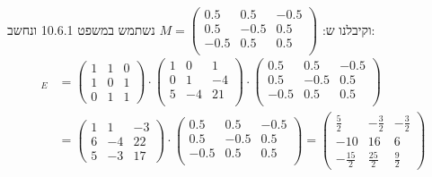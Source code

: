 \documentclass{article}
\begin{document}
	וקיבלנו ש: $M = \begin{pmatrix}
		0.5 & 0.5 & -0.5\\
		0.5 & -0.5 & 0.5 \\
		-0.5 & 0.5 & 0.5 \\
	\end{pmatrix}$
	נשתמש במשפט 10.6.1 ונחשב:
	\begin{align*}
		[T]_E &=
		\begin{pmatrix}
			1 & 1 & 0 \\
			1 & 0 & 1 \\
			0 & 1 & 1
		\end{pmatrix} \cdot
		\begin{pmatrix}
			1 & 0 & 1 \\
			0 & 1 & -4 \\
			5 & -4 & 21 \\
		\end{pmatrix} \cdot
		\begin{pmatrix}
			0.5 & 0.5 & -0.5\\
			0.5 & -0.5 & 0.5 \\
			-0.5 & 0.5 & 0.5 \\
		\end{pmatrix} \\
		&= \begin{pmatrix}
			1 & 1 & -3 \\
			6 & -4 & 22 \\
			5 & -3 & 17
		\end{pmatrix} \cdot
		\begin{pmatrix}
			0.5 & 0.5 & -0.5\\
			0.5 & -0.5 & 0.5 \\
			-0.5 & 0.5 & 0.5 \\
		\end{pmatrix} =
		\begin{pmatrix}
			\frac{5}{2} & -\frac{3}{2} & -\frac{3}{2} \\
			-10 & 16 & 6 \\
			-\frac{15}{2} & \frac{25}{2} & \frac{9}{2}
		\end{pmatrix}
	\end{align*}
\end{document}
